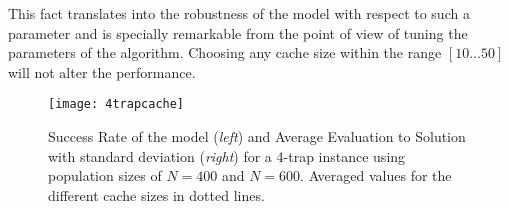 
  

 This fact translates into the robustness of the \evag model with respect to such a parameter and is specially remarkable from the point of view of tuning the parameters of the algorithm. Choosing any cache size within the range $[10\dots50]$ will not alter the \evag performance.

\begin{figure}[htbp]
\centerline{
\texttt{[image: 4trapcache]}
}
\caption{Success Rate of the \evag model ({\em left}) and Average Evaluation to Solution with standard deviation ({\em right})
for a 4-trap instance using population sizes of $N=400$ and $N=600$. Averaged values for the different cache sizes in dotted lines.}
\label{fig:cache:4trap}
\end{figure}






